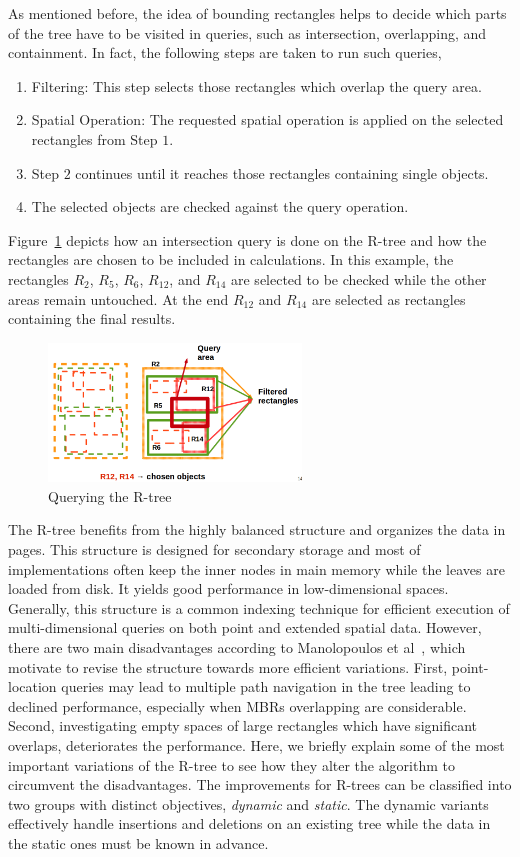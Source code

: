 \documentclass[a4paper,12pt]{article}
\begin{document}
As mentioned before, the idea of bounding rectangles helps to decide which parts of the tree have to be visited in queries, such as intersection, overlapping, and containment. In fact, the following steps are taken to run such queries,
\begin{enumerate}
\item Filtering: This step selects those rectangles which overlap the query area.
\item Spatial Operation: The requested spatial operation is applied on the selected rectangles from Step $1$. 
\item Step $2$ continues until it reaches those rectangles containing single objects. 
\item The selected objects are checked against the query operation. 
\end{enumerate}
Figure~\ref{rtreequery} depicts how an intersection query is done on the R-tree and how the rectangles are chosen to be included in calculations. In this example, the rectangles $R_2$, $R_5$, $R_6$, $R_{12}$, and $R_{14}$ are selected to be checked while the other areas remain untouched. At the end $R_{12}$ and $R_{14}$ are selected as rectangles containing the final results.

\begin{figure}
\centering
\includegraphics[width=0.6\textwidth,height=0.2\textheight]{Rtree-query}
\caption{Querying the R-tree}
\label{rtreequery}
\end{figure}

The R-tree benefits from the highly balanced structure and organizes the data in pages. This structure is designed for secondary storage and most of implementations often keep the inner nodes in main memory while the leaves are loaded from disk. It yields good performance in low-dimensional spaces. Generally, this structure is a common indexing technique for efficient execution of multi-dimensional queries on both point and extended spatial data. However, there are two main disadvantages according to Manolopoulos et al~\cite{Manolopoulos:2005}, which motivate to revise the structure towards more efficient variations. First, point-location queries may lead to multiple path navigation in the tree leading to declined performance, especially when MBRs overlapping are considerable. Second, investigating empty spaces of large rectangles which have significant overlaps, deteriorates the performance. Here, we briefly explain some of the most important variations of the R-tree to see how they alter the algorithm to circumvent the disadvantages. The improvements for R-trees can be classified into two groups with distinct objectives, \textit{dynamic} and \textit{static}. The dynamic variants effectively handle insertions and deletions on an existing tree while the data in the static ones must be known in advance. 
\end{document}
